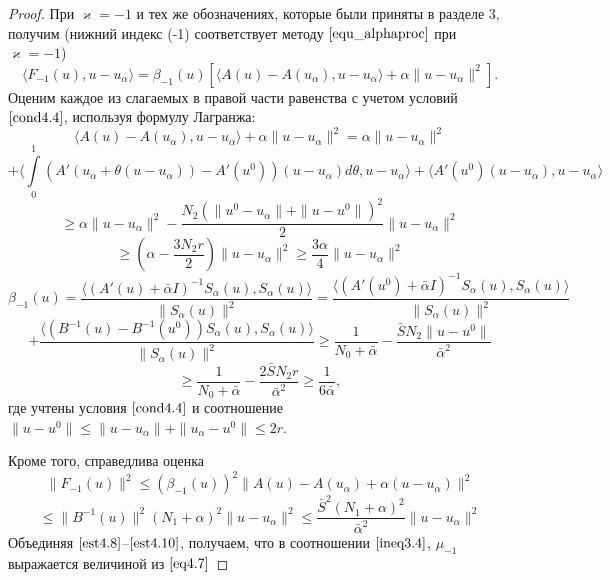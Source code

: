 \begin{proof} При $\varkappa=-1$ и тех же обозначениях, которые были приняты в разделе 3, получим (нижний индекс (-1) соответствует методу $\eqref{equ_alphaproc}$ при $\varkappa=-1$)
$$\langle F_{-1}(u), u-u_\alpha\rangle=\beta _{-1}(u)[\langle A(u)-A(u_\alpha), u-u_\alpha\rangle+\alpha\|u-u_\alpha\|^2].$$
Оценим каждое из слагаемых в правой части равенства с учетом условий $\eqref{cond4.4}$, используя формулу Лагранжа:
$$\langle A(u)-A(u_\alpha), u-u_\alpha\rangle+\alpha\|u-u_\alpha\|^2=\alpha\|u-u_\alpha\|^2$$ $$+\langle \int\limits_0^1 (A'(u_\alpha+\theta(u-u_\alpha))-A'(u^0))(u-u_\alpha)d\theta, u-u_\alpha\rangle+\langle A'(u^0)(u-u_\alpha), u-u_\alpha\rangle$$ $$\ge \alpha\|u-u_\alpha\|^2-\frac{N_2(\|u^0-u_\alpha\|+\|u-u^0\|)^2}{2}\|u-u_\alpha\|^2$$
\begin{equation}\label {est4.8}
\ge\left ( \alpha-\frac{3N_2 r}{2}\right )\|u-u_\alpha\|^2\ge\frac{3\alpha}{4}\|u-u_\alpha\|^2
\end{equation}
$$\beta _{-1}(u)=\frac{\langle (A'(u)+\bar\alpha I)^{-1}S_\alpha(u), S_\alpha(u)\rangle}{\|S_\alpha(u)\|^2}=\frac{\langle (A'(u^0)+\bar\alpha I)^{-1}S_\alpha(u), S_\alpha(u)\rangle}{\|S_\alpha(u)\|^2}$$ $$+\frac{\langle (B^{-1}(u)-B^{-1}(u^0))S_\alpha(u), S_\alpha(u)\rangle}{\|S_\alpha(u)\|^2}\ge\frac{1}{N_0+\bar\alpha}-\frac{\bar S N_2\|u-u^0\|}{\bar\alpha^2}$$
\begin{equation}\label{est4.9}
\ge\frac{1}{N_0+\bar\alpha}-\frac{2\bar S N_2 r}{\bar\alpha^2}\ge\frac{1}{6\bar\alpha},
\end{equation}
где учтены условия $\eqref{cond4.4}$ и соотношение $\|u-u^0\|\le\|u-u_\alpha\|+\|u_\alpha-u^0\|\le 2r$.

Кроме того, справедлива оценка
$$\|F_{-1}(u)\|^2\le(\beta_{-1}(u))^2\|A(u)-A(u_\alpha)+\alpha(u-u_\alpha)\|^2$$
\begin{equation}\label{est4.10}
\le\|B^{-1}(u)\|^2(N_1+\alpha)^2\|u-u_\alpha\|^2\le\frac{\bar S^2(N_1+\alpha)^2}{\bar\alpha^2}\|u-u_\alpha\|^2
\end{equation}
Объединяя $\eqref{est4.8}$--$\eqref{est4.10}$, получаем, что в соотношении $\eqref{ineq3.4}$, $\mu_{-1}$ выражается величиной из $\eqref{eq4.7}$


\end{proof}
